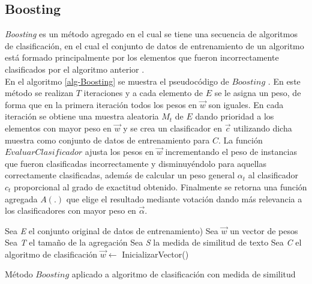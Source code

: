 \subsection{Boosting}
\textit{Boosting} es un método agregado en el cual se tiene una secuencia de algoritmos de clasificación, en el cual el conjunto de datos de entrenamiento de un algoritmo está formado principalmente por los elementos que fueron incorrectamente clasificados por el algoritmo anterior \cite{sabzevari2015ensemble}. \\
En el algoritmo \ref{alg-Boosting} se muestra el pseudocódigo de $Boosting$ \cite{sabzevari2015ensemble}. En este método se realizan $T$ iteraciones y a cada elemento de $E$ se le asigna un peso, de forma que en la primera iteración todos los pesos en $\vec{w}$ son iguales. En cada iteración se obtiene una muestra aleatoria $M_{t}$ de $E$ dando prioridad a los elementos con mayor peso en $\vec{w}$ y se crea un clasificador en $\vec{c}$ utilizando dicha muestra como conjunto de datos de entrenamiento para $C$. La función $EvaluarClasificador$ ajusta los pesos en $\vec{w}$ incrementando el peso de instancias que fueron clasificadas incorrectamente y disminuyéndolo para aquellas correctamente clasificadas, además de calcular un peso general ${\alpha}_{t}$ al clasificador $c_{t}$ proporcional al grado de exactitud obtenido. Finalmente se retorna una función agregada $A(.)$ que elige el resultado mediante votación dando más relevancia a los clasificadores con mayor peso en $\vec{\alpha}$.
\begin{algorithm}
\label{alg-Boosting}
Sea \textit{E} el conjunto original de datos de entrenamiento)\;
Sea $\vec{w}$ un vector de pesos\;
Sea \textit{T} el tamaño de la agregación\;
Sea \textit{S} la medida de similitud de texto\;
Sea \textit{C} el algoritmo de clasificación\;
$\vec{w} \leftarrow $ InicializarVector()\; 
\caption{Método $Boosting$ aplicado a algoritmo de clasificación con medida de similitud}
\end{algorithm}


